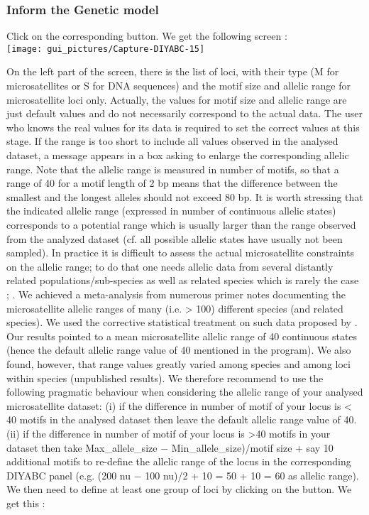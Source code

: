 \subsubsection{Inform the Genetic model}

Click on the corresponding  button. We get the
following screen : \\


\texttt{[image: gui\_pictures/Capture-DIYABC-15]}

On the left part of the screen, there is the list of loci, with their
type (M for microsatellites or S for DNA sequences) and the motif
size and allelic range for microsatellite loci only. Actually, the
values for motif size and allelic range are just default values and
do not necessarily correspond to the actual data. The user who knows
the real values for its data is required to set the correct values
at this stage. If the range is too short to include all values observed
in the analysed dataset, a message appears in a box asking to enlarge
the corresponding allelic range. Note that the allelic range is measured
in number of motifs, so that a range of 40 for a motif length of 2
bp means that the difference between the smallest and the longest
alleles should not exceed 80 bp. It is worth stressing that the indicated
allelic range (expressed in number of continuous allelic states) corresponds
to a potential range which is usually larger than the range observed
from the analyzed dataset (cf. all possible allelic states have usually
not been sampled). In practice it is difficult to assess the actual
microsatellite constraints on the allelic range; to do that one needs
allelic data from several distantly related populations/sub-species
as well as related species which is rarely the case \citep[see][]{PDD1998};
\citep{E2002}. We achieved a meta-analysis from numerous primer notes
documenting the microsatellite allelic ranges of many (i.e. \textgreater
100) different species (and related species). We used the corrective
statistical treatment on such data proposed by \citep{PDD1998}. Our
results pointed to a mean microsatellite allelic range of 40 continuous
states (hence the default allelic range value of 40 mentioned in the
program). We also found, however, that range values greatly varied
among species and among loci within species (unpublished results).
We therefore recommend to use the following pragmatic behaviour when
considering the allelic range of your analysed microsatellite dataset:
(i) if the difference in number of motif of your locus is \textless
40 motifs in the analysed dataset then leave the default allelic range
value of 40. (ii) if the difference in number of motif of your locus
is \textgreater 40 motifs in your dataset then take Max\_allele\_size
$-$ Min\_allele\_size)/motif size + say 10 additional motifs to re-define
the allelic range of the locus in the corresponding DIYABC panel (e.g.
(200 nu $-$ 100 nu)/2 + 10 = 50 + 10 = 60 as allelic range).\\
 We then need to define at least one group of loci by clicking on
the  button. We get this :\\



